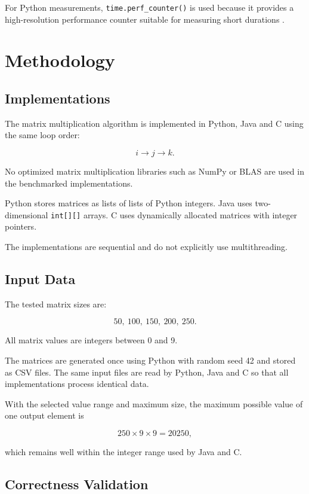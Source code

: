 \documentclass[11pt,a4paper]{article}
\begin{document}
For Python measurements, \texttt{time.perf\_counter()} is used because it provides a high-resolution performance counter suitable for measuring short durations \cite{python_time}.

\section{Methodology}

\subsection{Implementations}

The matrix multiplication algorithm is implemented in Python, Java and C using the same loop order:

\[
i \rightarrow j \rightarrow k.
\]

No optimized matrix multiplication libraries such as NumPy or BLAS are used in the benchmarked implementations.

Python stores matrices as lists of lists of Python integers. Java uses two-dimensional \texttt{int[][]} arrays. C uses dynamically allocated matrices with integer pointers.

The implementations are sequential and do not explicitly use multithreading.

\subsection{Input Data}

The tested matrix sizes are:

\[
50,\ 100,\ 150,\ 200,\ 250.
\]

All matrix values are integers between 0 and 9.

The matrices are generated once using Python with random seed 42 and stored as CSV files. The same input files are read by Python, Java and C so that all implementations process identical data.

With the selected value range and maximum size, the maximum possible value of one output element is

\[
250 \times 9 \times 9 = 20250,
\]

which remains well within the integer range used by Java and C.

\subsection{Correctness Validation}
\end{document}
